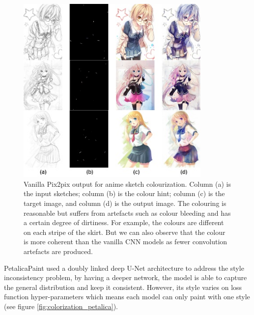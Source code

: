 \begin{figure}
    \centering
    \includegraphics[width=0.85\textwidth]{images/colorization/pix2pix.jpg}
    \caption{Vanilla Pix2pix output for anime sketch colourization. Column (a) is the input sketches; column (b) is the colour hint; column (c) is the target image, and column (d) is the output image.\cite{steinsDeepLearningProject2022} The colouring is reasonable but suffers from artefacts such as colour bleeding and has a certain degree of dirtiness. For example, the colours are different on each stripe of the skirt. But we can also observe that the colour is more coherent than the vanilla CNN models as fewer convolution artefacts are produced.} 
    \label{fig:colorization_pix2pix}
\end{figure}

PetalicaPaint\cite{PetalicaPaint} used a doubly linked deep U-Net architecture to address the style inconsistency problem, by having a deeper network, the model is able to capture the general distribution and keep it consistent. However, its style varies on loss function hyper-parameters which means each model can only paint with one style (see figure \ref{fig:colorization_petalica}).

